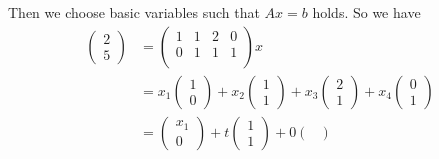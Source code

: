 \begin{definition}
        Then we choose basic variables such that $Ax = b$ holds. So we have
        \begin{align*}
            \begin{pmatrix}
                2 \\ 5
            \end{pmatrix} & = \begin{pmatrix}
                                  1 & 1 & 2 & 0 \\
                                  0 & 1 & 1 & 1 \\
                              \end{pmatrix}x                                                                   \\
                            & = x_1 \begin{pmatrix}
                                        1 \\ 0
                                    \end{pmatrix} + x_2 \begin{pmatrix}
                                                            1 \\ 1
                                                        \end{pmatrix} + x_3 \begin{pmatrix}
                                                                                2 \\ 1
                                                                            \end{pmatrix} + x_4 \begin{pmatrix}
                                                                                                    0 \\ 1
                                                                                                \end{pmatrix} \\
                            & = \begin{pmatrix}
                                    x_1 \\ 0
                                \end{pmatrix} + t \begin{pmatrix}
                                                      1 \\ 1
                                                  \end{pmatrix} + 0 \begin{pmatrix}

\end{pmatrix}
\end{align*}
\end{definition}
